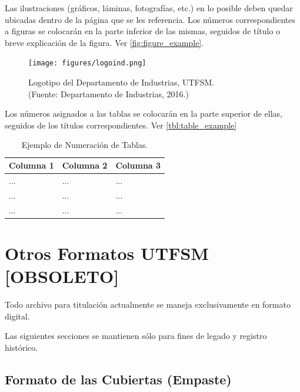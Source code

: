 \begin{description}
Las ilustraciones (gráficos, láminas, fotografías, etc.) en lo posible deben quedar ubicadas dentro de la página que se les referencia. Los números correspondientes a figuras se colocarán en la parte inferior de las mismas, seguidos de título o breve explicación de la figura. Ver \autoref{fig:figure_example}.
	\begin{figure}[ht!]
	\centering
	\texttt{[image: figures/logoind.png]}
	
	\caption[Logotipo del Departamento de Industrias, UTFSM.]{Logotipo del Departamento de Industrias, UTFSM.\\
	{\footnotesize (Fuente: Departamento de Industrias, 2016.)}}
	
	\label{fig:figure_example}
	\end{figure}

Los números asignados a las tablas se colocarán en la parte superior de ellas, seguidos de los títulos correspondientes. Ver \autoref{tbl:table_example}

\begin{table}[ht]
    \centering
    \caption[Ejemplo: Numeración de Tablas]{Ejemplo de Numeración de Tablas.}
    \begin{tabular}{@{}p{3cm}|p{3cm}|p{3cm}@{}}
        \toprule
        \textbf{Columna 1} & \textbf{Columna 2} & \textbf{Columna 3} \\
        \hline\hline
        ... & ... & ... \\
        \hline
        ... & ... & ... \\
        \hline
        ... & ... & ... \\
        \bottomrule
    \end{tabular}
    \label{tbl:table_example}
\end{table}

\end{description}

\section{Otros Formatos UTFSM [OBSOLETO]}

Todo archivo para titulación actualmente se maneja exclusivamente en formato digital.

Las siguientes secciones se mantienen sólo para fines de legado y registro histórico.

\subsection{Formato de las Cubiertas (Empaste)}

